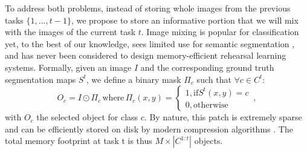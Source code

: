 To address both problems, instead of storing whole images from the previous tasks $\{1, ..., t-1\}$,
we propose to store an informative portion that we will mix with the images of the current task $t$.
Image mixing is popular for classification
\citep{hingyi2018mixup,yun2019cutmix,dabouei2020supermix,verma2019manifoldmixup,li2021moex,rame2021mixmo}
yet, to the best of our knowledge, sees limited use for semantic segmentation
\citep{fang2019instaboost,olsson2021classmix,zhang2021objectaug,tranheden2021dacs,ghiasi2020simplecopypaste},
and has never been considered to design memory-efficient rehearsal learning systems. Formally, given
an image $I$ and the corresponding ground truth segmentation maps $S^t$, we define a binary mask
$\Pi_c$  such that $\forall c \in C^t$:
%
\begin{equation}
    O_c = I \odot \Pi_c\,\text{where}\,\Pi_c(x, y) = \left\{\begin{array}{l}
        1, \text{if} S^t(x, y) = c \\
        0, \text{otherwise}
    \end{array}\right.\,,
    \label{eq:seg_mask_object}
\end{equation}
%
\noindent with $O_c$ the selected object for class $c$. By nature, this patch is extremely sparse
and can be efficiently stored on disk by modern compression algorithms \citep{ISO)10918}. The total
memory footprint at task t is thus $M \times |C^{1:t}|$ objects.

